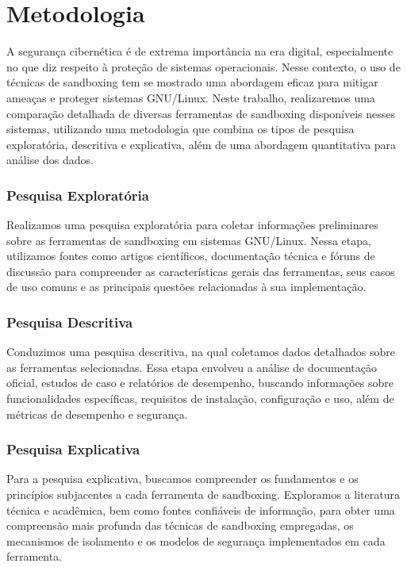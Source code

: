 \chapter{Metodologia}

A segurança cibernética é de extrema importância na era digital, especialmente no que diz respeito à proteção de sistemas operacionais. Nesse contexto, o uso de técnicas de sandboxing tem se mostrado uma abordagem eficaz para mitigar ameaças e proteger sistemas GNU/Linux. Neste trabalho, realizaremos uma comparação detalhada de diversas ferramentas de sandboxing disponíveis nesses sistemas, utilizando uma metodologia que combina os tipos de pesquisa exploratória, descritiva e explicativa, além de uma abordagem quantitativa para análise dos dados.

\subsection{Pesquisa Exploratória}
Realizamos uma pesquisa exploratória para coletar informações preliminares sobre as ferramentas de sandboxing em sistemas GNU/Linux. Nessa etapa, utilizamos fontes como artigos científicos, documentação técnica e fóruns de discussão para compreender as características gerais das ferramentas, seus casos de uso comuns e as principais questões relacionadas à sua implementação.

\subsection{Pesquisa Descritiva}
Conduzimos uma pesquisa descritiva, na qual coletamos dados detalhados sobre as ferramentas selecionadas. Essa etapa envolveu a análise de documentação oficial, estudos de caso e relatórios de desempenho, buscando informações sobre funcionalidades específicas, requisitos de instalação, configuração e uso, além de métricas de desempenho e segurança.

\subsection{Pesquisa Explicativa} 
Para a pesquisa explicativa, buscamos compreender os fundamentos e os princípios subjacentes a cada ferramenta de sandboxing. Exploramos a literatura técnica e acadêmica, bem como fontes confiáveis de informação, para obter uma compreensão mais profunda das técnicas de sandboxing empregadas, os mecanismos de isolamento e os modelos de segurança implementados em cada ferramenta.

